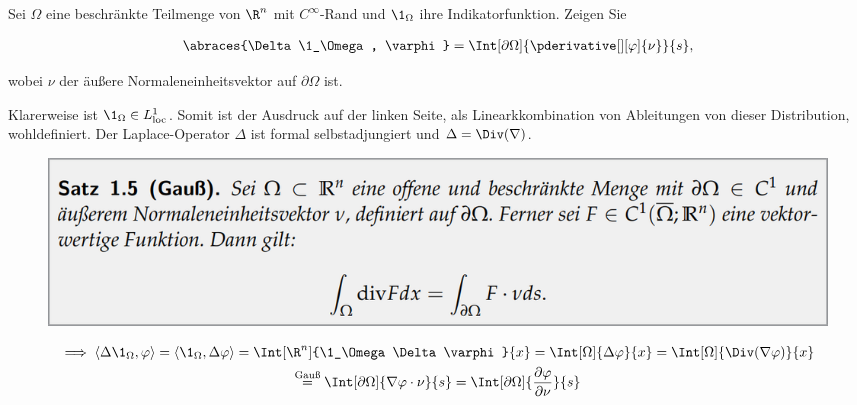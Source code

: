 
\begin{exercise}

Sei $\Omega$ eine beschränkte Teilmenge von $\R^n$ mit $C^{\infty}$-Rand und $\1_\Omega$ ihre Indikatorfunktion.
Zeigen Sie

\begin{align*}
  \abraces{\Delta \1_\Omega, \varphi}
  =
  \Int[\partial \Omega]{\pderivative[][\varphi]{\nu}}{s},
\end{align*}

wobei $\nu$ der äußere Normaleneinheitsvektor auf $\partial \Omega$ ist.

\end{exercise}


\begin{solution}

Klarerweise ist $\1_\Omega \in L^1_{\mathrm{loc}}$.
Somit ist der Ausdruck auf der linken Seite, als Linearkkombination von Ableitungen von dieser Distribution, wohldefiniert.
Der Laplace-Operator $\Delta$ ist formal selbstadjungiert und $\Delta = \Div(\nabla)$.

\begin{figure}[h!]
  \centering
  \includegraphics[width = 0.75 \textwidth]{Satz 1.5 (Gauß).png}
\end{figure}

\begin{multline*}
  \implies
  \langle \Delta \1_\Omega, \varphi \rangle
  =
  \langle  \1_\Omega, \Delta \varphi \rangle
  =
  \Int[\R^n]{\1_\Omega \Delta \varphi}{x}
  =
  \Int[\Omega]{\Delta \varphi}{x}
  =
  \Int[\Omega]{\Div(\nabla \varphi)}{x} \\
  \stackrel{\text{Gauß}}{=}
  \Int[\partial \Omega]{\nabla \varphi \cdot \nu}{s}
  =
  \Int[\partial \Omega]{\frac{\partial \varphi}{\partial \nu}}{s}
\end{multline*}

\end{solution}

